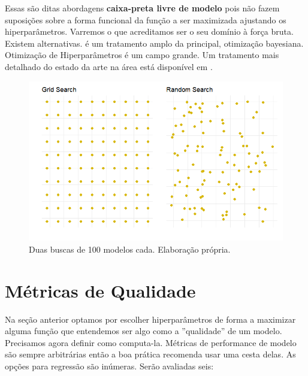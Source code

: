 Essas são ditas abordagens \textbf{caixa-preta livre de modelo} pois não fazem suposições sobre a forma funcional da função a ser maximizada ajustando os hiperparâmetros. Varremos o que acreditamos ser o seu domínio à força bruta. Existem alternativas.  é um tratamento amplo da principal, otimização bayesiana. Otimização de Hiperparâmetros é um campo grande. Um tratamento mais detalhado do estado da arte na área está disponível em .


\begin{figure}[H]
    \centering
    \includegraphics[scale = .75]{imagens/random_grid.png}
    \caption{Duas buscas de 100 modelos cada. Elaboração própria.}
\end{figure}

\section{Métricas de Qualidade}

Na seção anterior optamos por escolher hiperparâmetros de forma a maximizar alguma função que entendemos ser algo como a ''qualidade'' de um modelo. Precisamos agora definir como computa-la. Métricas de performance de modelo são sempre arbitrárias então a boa prática recomenda usar uma cesta delas. As opções para regressão são inúmeras. Serão avaliadas seis:

